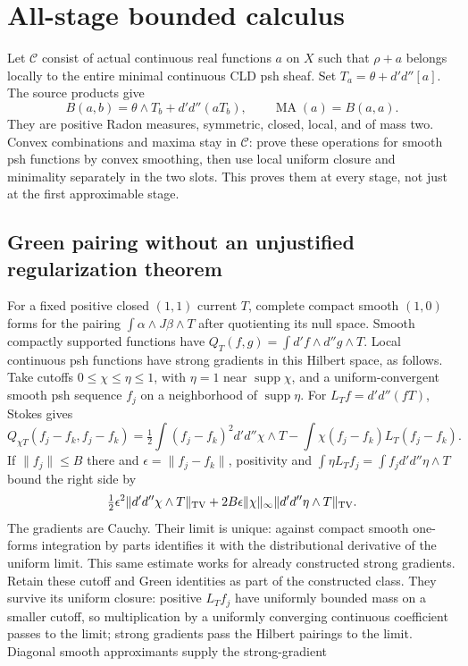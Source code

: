 \documentclass[11pt]{article}
\newcommand{\C}{\mathcal C}
\newcommand{\MA}{\operatorname{MA}}
\begin{document}
\section{All-stage bounded calculus}
Let $\C$ consist of actual continuous real functions $a$ on $X$ such that
$\rho+a$ belongs locally to the entire minimal continuous CLD psh sheaf.
Set $T_a=\theta+d'd''[a]$. The source products give
\[
 B(a,b)=\theta\wedge T_b+d'd''(aT_b),\qquad
 \MA(a)=B(a,a).
\]
They are positive Radon measures, symmetric, closed, local, and of mass two.
Convex combinations and maxima stay in $\C$: prove these operations for
smooth psh functions by convex smoothing, then use local uniform closure
and minimality separately in the two slots. This proves them at every stage,
not just at the first approximable stage.

\subsection{Green pairing without an unjustified regularization theorem}
For a fixed positive closed $(1,1)$ current $T$, complete compact smooth
$(1,0)$ forms for the pairing $\int\alpha\wedge J\beta\wedge T$ after
quotienting its null space. Smooth compactly supported functions have
$Q_T(f,g)=\int d'f\wedge d''g\wedge T$. Local continuous psh functions
have strong gradients in this Hilbert space, as follows.
Take cutoffs $0\le\chi\le\eta\le1$, with $\eta=1$ near
$\operatorname{supp}\chi$, and a uniform-convergent smooth psh sequence
$f_j$ on a neighborhood of $\operatorname{supp}\eta$.
For $L_T f=d'd''(fT)$, Stokes gives
\[
 Q_{\chi T}(f_j-f_k,f_j-f_k)
 =\tfrac12\int(f_j-f_k)^2d'd''\chi\wedge T
       -\int\chi(f_j-f_k)L_T(f_j-f_k).
\]
If $\|f_j\|\le B$ there and $\epsilon=\|f_j-f_k\|$, positivity and
$\int\eta L_Tf_j=\int f_jd'd''\eta\wedge T$ bound the right side by
\[
 \tfrac12\epsilon^2\|d'd''\chi\wedge T\|_{\rm TV}
 +2B\epsilon\|\chi\|_\infty\|d'd''\eta\wedge T\|_{\rm TV}.
\]
The gradients are Cauchy. Their limit is unique: against compact smooth
one-forms integration by parts identifies it with the distributional derivative
of the uniform limit. This same estimate works for already constructed strong
gradients. Retain these cutoff and Green identities as part of the constructed class.
They survive its uniform closure: positive $L_Tf_j$ have uniformly bounded
mass on a smaller cutoff, so multiplication by a uniformly converging
continuous coefficient passes to the limit; strong gradients pass the Hilbert
pairings to the limit. Diagonal smooth approximants supply the strong-gradient
\end{document}
